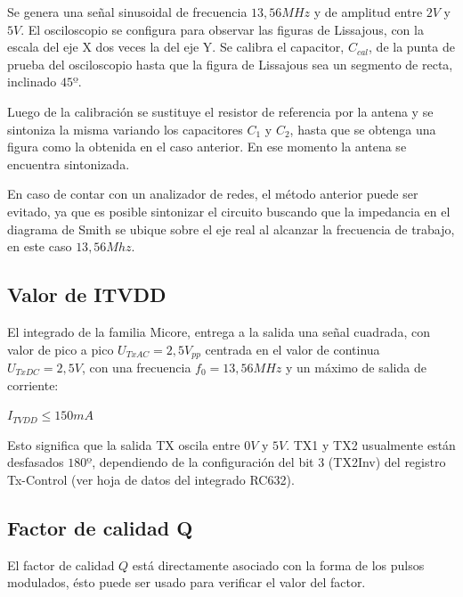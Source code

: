 \bigskip
\begin{itshape}
\end{itshape}

Se genera una señal sinusoidal de frecuencia $13,56MHz$ y de amplitud entre $2V$ y $5V$.
El osciloscopio se configura para observar las figuras de Lissajous, con la escala del eje X dos veces la del eje Y.
Se calibra el capacitor, $C_{cal}$, de la punta de prueba del osciloscopio hasta que la figura de Lissajous sea un segmento de recta, inclinado $45º$.

\bigskip
\begin{itshape}
\end{itshape}

Luego de la calibración se sustituye el resistor de referencia por la antena y se sintoniza la misma variando los capacitores $C_{1}$ y $C_{2}$, hasta que se obtenga una figura como la obtenida en el caso anterior. En ese momento la antena se encuentra sintonizada.


En caso de contar con un analizador de redes, el método anterior puede ser evitado, ya que es posible sintonizar el circuito buscando que la impedancia en el diagrama de Smith se ubique sobre el eje real al alcanzar la frecuencia de trabajo, en este caso $13,56 Mhz$.


\subsection{Valor de ITVDD}

El integrado de la familia Micore, entrega a la salida una señal cuadrada, con valor de pico a pico $U_{TxAC} = 2,5V_{pp}$ centrada en el valor de continua  $U_{TxDC} = 2,5V$, con una frecuencia $f_{0} = 13,56MHz$ y un máximo de salida de corriente: 


\centerline{$I_{TVDD} \leq 150mA$}


Esto significa que la salida TX oscila entre $0V$ y $5V$. TX1 y TX2 usualmente están desfasados $180º$, dependiendo de la configuración del bit 3 (TX2Inv) del registro Tx-Control (ver hoja de datos del integrado RC632).


\subsection{Factor de calidad Q}

El factor de calidad $Q$ está directamente asociado con la forma de los pulsos modulados, ésto puede ser usado para verificar el valor del factor.

